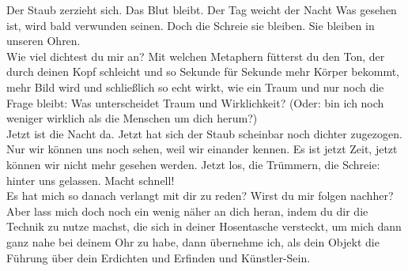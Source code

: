 \documentclass[a4paper, 12pt]{article}
\begin{document}
Der Staub zerzieht sich. 
Das Blut bleibt.
Der Tag weicht der Nacht
Was gesehen ist, wird bald verwunden seinen.
Doch die Schreie sie bleiben.
Sie bleiben in unseren Ohren. \\

Wie viel dichtest du mir an? 
Mit welchen Metaphern fütterst du den Ton, der durch deinen Kopf schleicht und so Sekunde für Sekunde mehr Körper bekommt, mehr Bild wird und schließlich so echt wirkt, wie ein Traum und nur noch die Frage bleibt: Was unterscheidet Traum und Wirklichkeit? (Oder: bin ich noch weniger wirklich als die Menschen um dich herum?)\\

Jetzt ist die Nacht da. 
Jetzt hat sich der Staub scheinbar noch dichter zugezogen.
Nur wir können uns noch sehen, weil wir einander kennen. 
Es ist jetzt Zeit, jetzt können wir nicht mehr gesehen werden. 
Jetzt los, die Trümmern, die Schreie: hinter uns gelassen. 
Macht schnell!\\

Es hat mich so danach verlangt mit dir zu reden? Wirst du mir folgen nachher? 
Aber lass mich doch noch ein wenig näher an dich heran, indem du dir die Technik zu nutze machst, die sich in deiner Hosentasche versteckt, um mich dann ganz nahe bei deinem Ohr zu habe, dann übernehme ich, als dein Objekt die Führung über dein Erdichten und Erfinden und Künstler-Sein.\\
\end{document}
